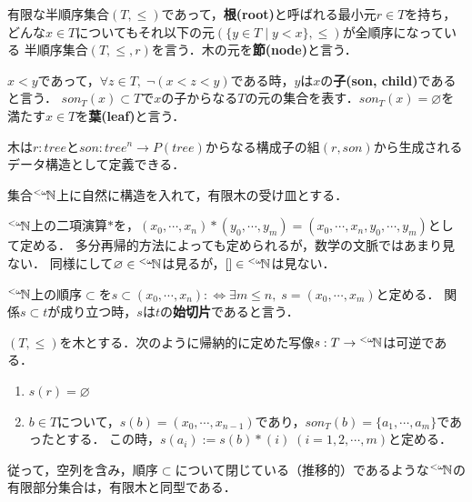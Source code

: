 \documentclass[uplatex, dvipdfmx]{jsreport}
\begin{document}
\begin{definition}
    有限な半順序集合$(T,\le)$であって，\textbf{根(root)}と呼ばれる最小元$r\in T$を持ち，
    どんな$x\in T$についてもそれ以下の元$(\{y\in T\mid y<x\},\le)$が全順序になっている
    半順序集合$(T,\le,r)$を言う．木の元を\textbf{節(node)}と言う．

    $x<y$であって，$\forall z\in T,\; \lnot(x<z<y)$である時，$y$は$x$の\textbf{子(son, child)}であると言う．
    $son_T(x)\subset T$で$x$の子からなる$T$の元の集合を表す．$son_T(x)=\varnothing$を満たす$x\in T$を\textbf{葉(leaf)}と言う．
\end{definition}
\begin{remark}
    木は$r:tree$と$son:tree^n\to P(tree)$からなる構成子の組$(r,son)$から生成されるデータ構造として定義できる．
\end{remark}

集合${}^{<\omega}\!\mathbb{N}$上に自然に構造を入れて，有限木の受け皿とする．

\begin{definition}[concatenation]
    ${}^{<\omega}\!\mathbb{N}$上の二項演算$*$を，$(x_0,\cdots,x_n)*(y_0,\cdots,y_m)=(x_0,\cdots,x_n,y_0,\cdots,y_m)$として定める．
    多分再帰的方法によっても定められるが，数学の文脈ではあまり見ない．
    同様にして$\varnothing\in{}^{<\omega}\!\mathbb{N}$は見るが，$[]\in{}^{<\omega}\!\mathbb{N}$は見ない．
\end{definition}

\begin{definition}
    ${}^{<\omega}\!\mathbb{N}$上の順序$\subset$を$s\subset (x_0,\cdots,x_{n}):\Leftrightarrow\exists m\le n,\; s=(x_0,\cdots,x_m)$と定める．
    関係$s\subset t$が成り立つ時，$s$は$t$の\textbf{始切片}であると言う．
\end{definition}

\begin{proposition}[有限木の自然数の有限列による表現]
    $(T,\le)$を木とする．次のように帰納的に定めた写像$s:T\to{}^{<\omega}\!\mathbb{N}$は可逆である．
    \begin{enumerate}
        \item $s(r)=\varnothing$
        \item $b\in T$について，$s(b)=(x_0,\cdots,x_{n-1})$であり，$son_T(b)=\{a_1,\cdots,a_m\}$であったとする．
        この時，$s(a_i):=s(b)*(i)\;(i=1,2,\cdots,m)$と定める．
    \end{enumerate}
\end{proposition}
\begin{remark}
    従って，空列を含み，順序$\subset$について閉じている（推移的）であるような${}^{<\omega}\!\mathbb{N}$の有限部分集合は，有限木と同型である．
\end{remark}
\end{document}

